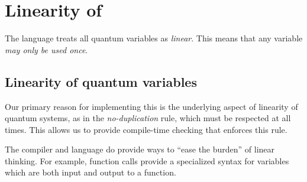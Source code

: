 \section{Linearity of \lqpl}\label{sec:lqpllinearity}
The language \lqpl{} treats all quantum variables as \emph{linear}. This 
means that any variable \emph{may only be used once}. 

\subsection{Linearity of quantum variables}\label{subsec:linearityofqvs}
Our primary reason for implementing this is the underlying aspect of 
linearity of quantum systems, as in the \emph{no-duplication} rule, 
which must be respected at all times. This allows us to provide
compile-time checking that enforces this rule.

The compiler and language do
 provide ways to ``ease the burden'' of linear thinking. 
For example, function calls provide a specialized syntax for variables
which are both input and output to a function. 

